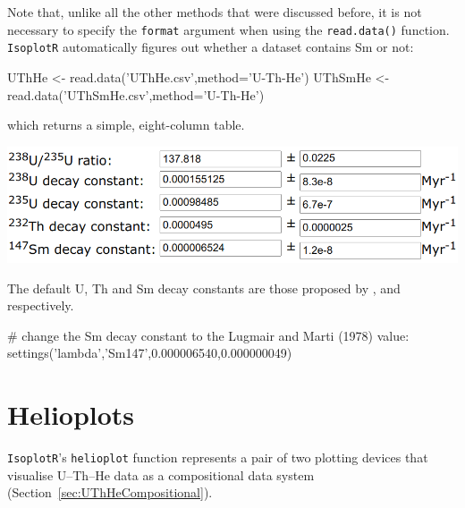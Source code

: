 \begin{refsection}
Note that, unlike all the other methods that were discussed before, it
is not necessary to specify the \texttt{format} argument when using
the \texttt{read.data()} function. \texttt{IsoplotR} automatically
figures out whether a dataset contains Sm or not:

\begin{script}
UThHe <- read.data('UThHe.csv',method='U-Th-He')
UThSmHe <- read.data('UThSmHe.csv',method='U-Th-He')
\end{script}

\noindent which returns a simple, eight-column table.\\

\noindent\begin{minipage}[t]{.65\linewidth}
\strut\vspace*{-\baselineskip}\newline
\includegraphics[width=\linewidth]{../figures/UThSmHeLambda.png}
\end{minipage}
\begin{minipage}[t]{.35\textwidth}
  The default U, Th and Sm decay constants are those proposed by
  \citet{jaffey1971}, \citet{leroux1963} and \citet{villa2020}
  respectively.
\end{minipage}

\begin{script}
# change the Sm decay constant to the Lugmair and Marti (1978) value:
settings('lambda','Sm147',0.000006540,0.000000049)
\end{script}

\section{Helioplots}\label{sec:helioplot-R}

\texttt{IsoplotR}'s \texttt{helioplot} function represents a pair of
two plotting devices that visualise U--Th--He data as a compositional
data system (Section~\ref{sec:UThHeCompositional}).\\


\end{refsection}
